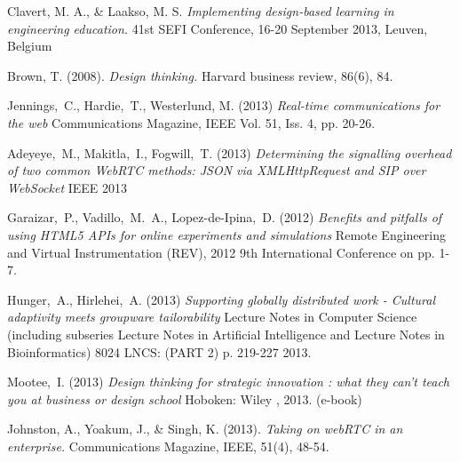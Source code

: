 \documentclass[english,12pt,a4paper,dvips]{article}
\begin{document}
\begin{thebibliography}{99}

 Clavert, M. A., & Laakso, M. S. \textit{Implementing design-based learning in engineering education.} 41st SEFI Conference, 16-20 September 2013, Leuven, Belgium

 Brown, T. (2008). \textit{Design thinking.} Harvard business review, 86(6), 84.

 Jennings,\ C., Hardie,\ T., Westerlund, M. (2013) \textit{Real-time communications for the web} Communications Magazine, IEEE Vol. 51, Iss. 4, pp. 20-26. %

 Adeyeye,\ M., Makitla,\ I., Fogwill,\ T. (2013) \textit{Determining the signalling overhead of two common WebRTC methods: JSON via XMLHttpRequest and SIP over WebSocket} IEEE 2013

 Garaizar,\ P., Vadillo,\ M.\ A., Lopez-de-Ipina,\ D. (2012) \textit{Benefits and pitfalls of using HTML5 APIs for online experiments and simulations} Remote Engineering and Virtual Instrumentation (REV), 2012 9th International Conference on pp. 1-7. %

 Hunger,\ A., Hirlehei,\ A. (2013) \textit{Supporting globally distributed work - Cultural adaptivity meets groupware tailorability} Lecture Notes in Computer Science (including subseries Lecture Notes in Artificial Intelligence and Lecture Notes in Bioinformatics) 8024 LNCS: (PART 2) p. 219-227 2013. %

 Mootee,\ I. (2013) \textit{Design thinking for strategic innovation : what they can't teach you at business or design school} Hoboken: Wiley , 2013. (e-book) %

 Johnston, A., Yoakum, J., & Singh, K. (2013). \textit{Taking on webRTC in an enterprise.} Communications Magazine, IEEE, 51(4), 48-54.
\bibitem{} \textit{}

\bibitem{} \textit{}

\bibitem{} \textit{}

\end{thebibliography}
\end{document}
